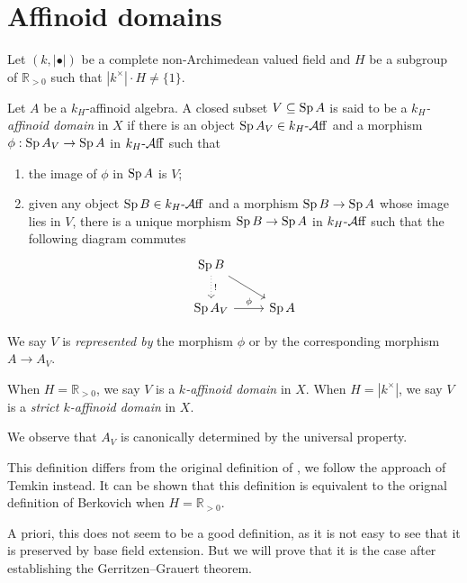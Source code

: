 \section{Affinoid domains}
Let $(k,|\bullet|)$ be a complete non-Archimedean valued field and $H$ be a subgroup of $\mathbb{R}_{>0}$ such that $|k^{\times}|\cdot H\neq \{1\}$.

\begin{definition}\label{def-affinoiddomain}
    Let $A$ be a $k_H$-affinoid algebra. A closed subset $V\subseteq \operatorname{Sp} A$ is said to be a \emph{$k_H$-affinoid domain} in $X$ if there is an object $\operatorname{Sp} A_V\in k_H\text{-}\mathcal{A}\mathrm{ff}$ and a morphism $\phi:\operatorname{Sp} A_V\rightarrow \operatorname{Sp} A$ in $k_H\text{-}\mathcal{A}\mathrm{ff}$ such that
    \begin{enumerate}
        \item the image of $\phi$ in $\operatorname{Sp} A$ is $V$;
        \item given any object $\operatorname{Sp} B\in k_H\text{-}\mathcal{A}\mathrm{ff}$ and a morphism $\operatorname{Sp} B\rightarrow \operatorname{Sp} A$ whose image lies in $V$, there is a unique morphism $\operatorname{Sp} B\rightarrow \operatorname{Sp} A$ in $k_H\text{-}\mathcal{A}\mathrm{ff}$ such that the following diagram commutes
        \[
            \begin{tikzcd}
                \Sp B \arrow[d, "!", dotted] \arrow[rd] &       \\
                \Sp A_V \arrow[r, "\phi"]               & \Sp A
            \end{tikzcd}    
        \]
    \end{enumerate}

    We say $V$ is \emph{represented by} the morphism $\phi$ or by the corresponding morphism $A\rightarrow A_V$.

    When $H=\mathbb{R}_{>0}$, we say $V$ is a \emph{$k$-affinoid domain} in $X$. When $H=|k^{\times}|$, we say $V$ is a \emph{strict $k$-affinoid domain} in $X$.
\end{definition}
We observe that $A_V$ is canonically determined by the universal property.
\begin{remark}
    This definition differs from the original definition of \cite{Berk12}, we follow the approach of Temkin instead. It can be shown that this definition is equivalent to the orignal definition of Berkovich when $H=\mathbb{R}_{>0}$.
\end{remark}
A priori, this does not seem to be a good definition, as it is not easy to see that it is preserved by base field extension. But we will prove that it is the case after establishing the Gerritzen--Grauert theorem.

